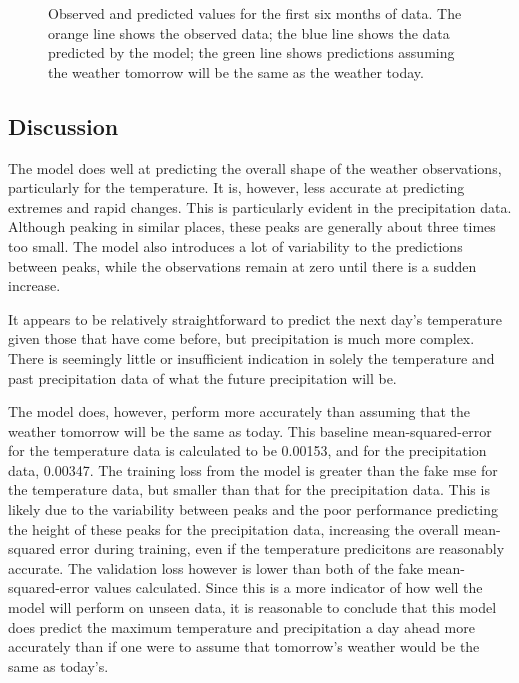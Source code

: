 \documentclass[12pt]{article}
\begin{document}
    \begin{figure}
        \centering
        
        \caption{Observed and predicted values for the first six months of data. The orange line shows the observed data; the blue line shows the data predicted by the model; the green line shows predictions assuming the weather tomorrow will be the same as the weather today.}
        \label{fig:weather_detailed_prediction}
    \end{figure}

\subsection{Discussion}

    The model does well at predicting the overall shape of the weather observations, particularly for the temperature. It is, however, less accurate at predicting extremes and rapid changes. This is particularly evident in the precipitation data. Although peaking in similar places, these peaks are generally about three times too small. The model also introduces a lot of variability to the predictions between peaks, while the observations remain at zero until there is a sudden increase. 

    It appears to be relatively straightforward to predict the next day's temperature given those that have come before, but precipitation is much more complex. There is seemingly little or insufficient indication in solely the temperature and past precipitation data of what the future precipitation will be.
    
    The model does, however, perform more accurately than assuming that the weather tomorrow will be the same as today. This baseline mean-squared-error for the temperature data is calculated to be 0.00153, and for the precipitation data, 0.00347. The training loss from the model is greater than the fake mse for the temperature data, but smaller than that for the precipitation data. This is likely due to the variability between peaks and the poor performance predicting the height of these peaks for the precipitation data, increasing the overall mean-squared error during training, even if the temperature predicitons are reasonably accurate. The validation loss however is lower than both of the fake mean-squared-error values calculated. Since this is a more indicator of how well the model will perform on unseen data, it is reasonable to conclude that this model does predict the maximum temperature and precipitation a day ahead more accurately than if one were to assume that tomorrow's weather would be the same as today's.
\end{document}
